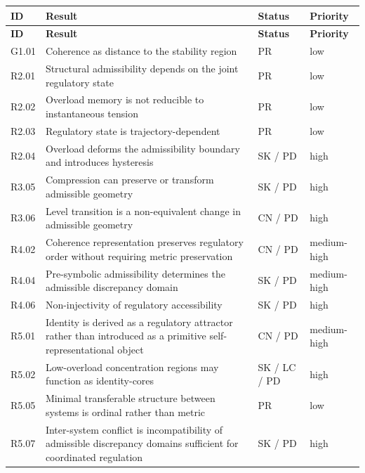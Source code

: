 \documentclass[12pt]{article}
\begin{document}
	\begin{longtable}{>{\RaggedRight\arraybackslash}p{}
			>{\RaggedRight\arraybackslash}p{}
			>{\RaggedRight\arraybackslash}p{}
			>{\RaggedRight\arraybackslash}p{}}
		\toprule
		\textbf{ID} & \textbf{Result} & \textbf{Status} & \textbf{Priority} \\
		\midrule
		\endfirsthead
		\toprule
		\textbf{ID} & \textbf{Result} & \textbf{Status} & \textbf{Priority} \\
		\midrule
		\endhead
		
		G1.01 & Coherence as distance to the stability region & PR & low \\
		
		R2.01 & Structural admissibility depends on the joint regulatory state & PR & low \\
		
		R2.02 & Overload memory is not reducible to instantaneous tension & PR & low \\
		
		R2.03 & Regulatory state is trajectory-dependent & PR & low \\
		
		R2.04 & Overload deforms the admissibility boundary and introduces hysteresis & SK / PD & high \\
		
		R3.05 & Compression can preserve or transform admissible geometry & SK / PD & high \\
		
		R3.06 & Level transition is a non-equivalent change in admissible geometry & CN / PD & high \\
		
		R4.02 & Coherence representation preserves regulatory order without requiring metric preservation & CN / PD & medium-high \\
		
		R4.04 & Pre-symbolic admissibility determines the admissible discrepancy domain & SK / PD & medium-high \\
		
		R4.06 & Non-injectivity of regulatory accessibility & SK / PD & high \\
		
		R5.01 & Identity is derived as a regulatory attractor rather than introduced as a primitive self-representational object & CN / PD & medium-high \\
		
		R5.02 & Low-overload concentration regions may function as identity-cores & SK / LC / PD & high \\
		
		R5.05 & Minimal transferable structure between systems is ordinal rather than metric & PR & low \\
		
		R5.07 & Inter-system conflict is incompatibility of admissible discrepancy domains sufficient for coordinated regulation & SK / PD & high \\
		
		\bottomrule
	\end{longtable}
	
\end{document}
